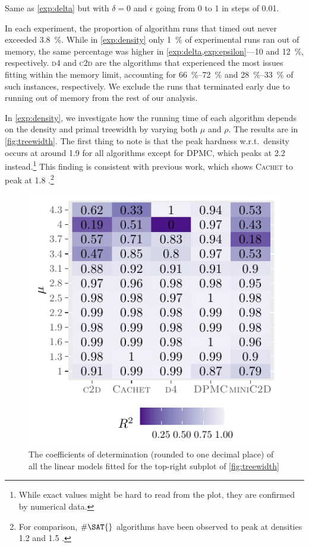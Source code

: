 \begin{experiment}[$\epsilon$]\label{exp:epsilon}
  Same as \cref{exp:delta} but with $\delta = 0$ and $\epsilon$ going from 0 to
  1 in steps of 0.01.
\end{experiment}

In each experiment, the proportion of algorithm runs that timed out never
exceeded \SI{3.8}{\percent}. While in \cref{exp:density} only \SI{1}{\percent}
of experimental runs ran out of memory, the same percentage was higher in
\cref{exp:delta,exp:epsilon}---10 and \SI{12}{\percent}, respectively.
\textsc{d4} \citep{DBLP:conf/ijcai/LagniezM17} and
\textsc{c2d} are the algorithms that
experienced the most issues fitting within the memory limit, accounting for
\SIrange{66}{72}{\percent} and \SIrange{28}{33}{\percent} of such instances,
respectively. We exclude the runs that terminated early due to running out of
memory from the rest of our analysis.

In \cref{exp:density}, we investigate how the running time of each algorithm
depends on the density and primal treewidth by varying both $\mu$ and $\rho$.
The results are in \cref{fig:treewidth}. The first thing to note is that the
peak hardness w.r.t.\ density occurs at around 1.9 for all algorithms except for
\textsc{DPMC}, which peaks at 2.2 instead.\footnote{While exact values might be hard to read from the plot, they are confirmed by numerical data.} This finding is consistent with previous work, which shows \textsc{Cachet} to peak at 1.8 \citep{DBLP:conf/sat/SangBBKP04}.\footnote{For comparison, $\#\SAT{}$ algorithms have been observed to peak at densities 1.2 and 1.5 \citep{DBLP:conf/aaai/Pehoushek00}.}

\begin{figure}[t]
  \centering
  \includegraphics{chapters/comparison/r2}
  \caption{The coefficients of determination (rounded to one decimal place) of
    all the linear models fitted for the top-right subplot of
    \cref{fig:treewidth}}\label{fig:r2}
\end{figure}

